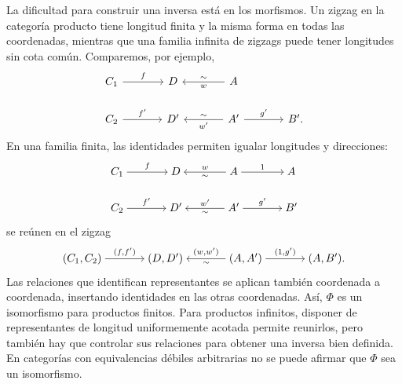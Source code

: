La dificultad para construir una inversa está en los morfismos. Un zigzag en la categoría producto tiene longitud finita y la misma forma en todas las coordenadas, mientras que una familia infinita de zigzags puede tener longitudes sin cota común. Comparemos, por ejemplo,
\[
\begin{tikzcd}[column sep=large]
C_1 \arrow[r,"f"] & D & A \arrow[l,"w","\sim"'] &\\
C_2 \arrow[r,"f'"] & D' & A' \arrow[l,"w'","\sim"'] \arrow[r,"g'"] & B'.
\end{tikzcd}
\]
En una familia finita, las identidades permiten igualar longitudes y direcciones:
\[
\begin{tikzcd}[cramped,column sep=large]
C_1 \arrow[r,"f"] & D \arrow[r,leftarrow,"w","\sim"'] & A \arrow[r,"1"] & A\\
C_2 \arrow[r,"f'"] & D' \arrow[r,leftarrow,"w'","\sim"'] & A' \arrow[r,"g'"] & B'
\end{tikzcd}
\]
se reúnen en el zigzag
\[
\begin{tikzcd}[cramped,column sep=large]
(C_1,C_2) \arrow[r,"{(f,f')}"]
& (D,D') \arrow[r,leftarrow,"{(w,w')}","\sim"']
& (A,A') \arrow[r,"{(1,g')}"] & (A,B').
\end{tikzcd}
\]
Las relaciones que identifican representantes se aplican también coordenada a coordenada, insertando identidades en las otras coordenadas. Así, $\Phi$ es un isomorfismo para productos finitos. Para productos infinitos, disponer de representantes de longitud uniformemente acotada permite reunirlos, pero también hay que controlar sus relaciones para obtener una inversa bien definida. En categorías con equivalencias débiles arbitrarias no se puede afirmar que $\Phi$ sea un isomorfismo.

